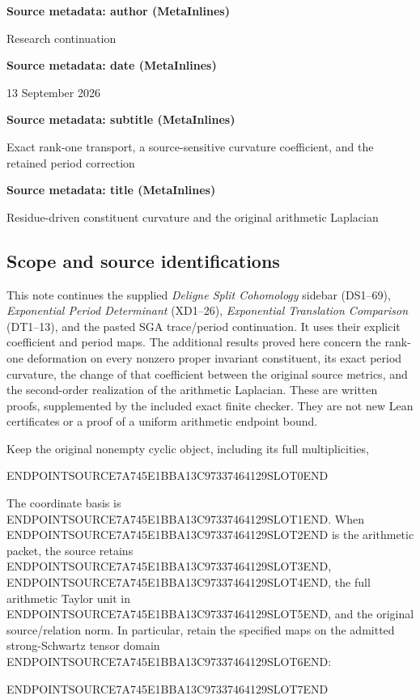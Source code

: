 \textbf{Source metadata: author (MetaInlines)}

Research continuation

\textbf{Source metadata: date (MetaInlines)}

13 September 2026

\textbf{Source metadata: subtitle (MetaInlines)}

Exact rank-one transport, a source-sensitive curvature coefficient, and the retained period correction

\textbf{Source metadata: title (MetaInlines)}

Residue-driven constituent curvature and the original arithmetic Laplacian

\subsection{Scope and source identifications}\label{endpoint-residue_original--scope-and-source-identifications}

This note continues the supplied \emph{Deligne Split Cohomology} sidebar (DS1--69), \emph{Exponential Period Determinant} (XD1--26), \emph{Exponential Translation Comparison} (DT1--13), and the pasted SGA trace/period continuation. It uses their explicit coefficient and period maps. The additional results proved here concern the rank-one deformation on every nonzero proper invariant constituent, its exact period curvature, the change of that coefficient between the original source metrics, and the second-order realization of the arithmetic Laplacian. These are written proofs, supplemented by the included exact finite checker. They are not new Lean certificates or a proof of a uniform arithmetic endpoint bound.

Keep the original nonempty cyclic object, including its full multiplicities,

ENDPOINTSOURCE7A745E1BBA13C97337464129SLOT0END

The coordinate basis is ENDPOINTSOURCE7A745E1BBA13C97337464129SLOT1END. When ENDPOINTSOURCE7A745E1BBA13C97337464129SLOT2END is the arithmetic packet, the source retains ENDPOINTSOURCE7A745E1BBA13C97337464129SLOT3END, ENDPOINTSOURCE7A745E1BBA13C97337464129SLOT4END, the full arithmetic Taylor unit in ENDPOINTSOURCE7A745E1BBA13C97337464129SLOT5END, and the original source/relation norm. In particular, retain the specified maps on the admitted strong-Schwartz tensor domain ENDPOINTSOURCE7A745E1BBA13C97337464129SLOT6END:

ENDPOINTSOURCE7A745E1BBA13C97337464129SLOT7END

